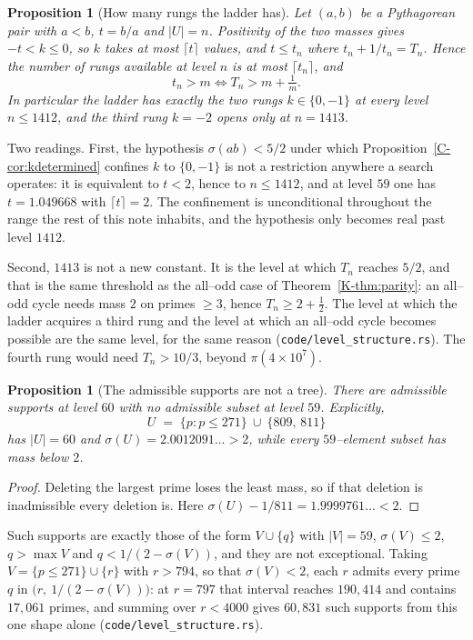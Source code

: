 \documentclass[11pt]{article}
\newtheorem{proposition}[theorem]{Proposition}
\theoremstyle{definition}
\begin{document}
\begin{proposition}[How many rungs the ladder has]\label{prop:rungcount}
Let $(a,b)$ be a Pythagorean pair with $a<b$, $t=b/a$ and $|U|=n$. Positivity of the two masses gives
$-t<k\le0$, so $k$ takes at most $\lceil t\rceil$ values, and $t\le t_n$ where $t_n+1/t_n=T_n$. Hence
the number of rungs available at level $n$ is at most $\lceil t_n\rceil$, and
\[ t_n>m\iff T_n>m+\tfrac1m . \]
In particular the ladder has exactly the two rungs $k\in\{0,-1\}$ at every level $n\le1412$, and the
third rung $k=-2$ opens only at $n=1413$.
\end{proposition}

Two readings. First, the hypothesis $\sigma(ab)<5/2$ under which
Proposition~\ref{C-cor:kdetermined} confines $k$ to $\{0,-1\}$ is not a restriction anywhere a search
operates: it is equivalent to $t<2$, hence to $n\le1412$, and at level $59$ one has $t=1.049668$ with
$\lceil t\rceil=2$. The confinement is unconditional throughout the range the rest of this note
inhabits, and the hypothesis only becomes real past level $1412$.

Second, $1413$ is not a new constant. It is the level at which $T_n$ reaches $5/2$, and that is the
same threshold as the all--odd case of Theorem~\ref{K-thm:parity}: an all--odd cycle needs mass $2$ on
primes $\ge3$, hence $T_n\ge2+\tfrac12$. The level at which the ladder acquires a third rung and the
level at which an all--odd cycle becomes possible are the same level, for the same reason
\textup{(\texttt{code/level\_structure.rs})}. The fourth rung would need $T_n>10/3$, beyond
$\pi(4\times10^{7})$.

\begin{proposition}[The admissible supports are not a tree]\label{prop:nottree}
There are admissible supports at level $60$ with no admissible subset at level $59$. Explicitly,
\[ U\;=\;\{p:p\le271\}\ \cup\ \{809,\,811\} \]
has $|U|=60$ and $\sigma(U)=2.0012091\ldots>2$, while every $59$--element subset has mass below $2$.
\end{proposition}
\begin{proof}
Deleting the largest prime loses the least mass, so if that deletion is inadmissible every deletion
is. Here $\sigma(U)-1/811=1.9999761\ldots<2$.
\end{proof}

Such supports are exactly those of the form $V\cup\{q\}$ with $|V|=59$, $\sigma(V)\le2$,
$q>\max V$ and $q<1/(2-\sigma(V))$, and they are not exceptional. Taking $V=\{p\le271\}\cup\{r\}$
with $r>794$, so that $\sigma(V)<2$, each $r$ admits every prime $q$ in
$\bigl(r,\ 1/(2-\sigma(V))\bigr)$: at $r=797$ that interval reaches $190{,}414$ and contains
$17{,}061$ primes, and summing over $r<4000$ gives $60{,}831$ such supports from this one shape alone
\textup{(\texttt{code/level\_structure.rs})}.
\end{document}
